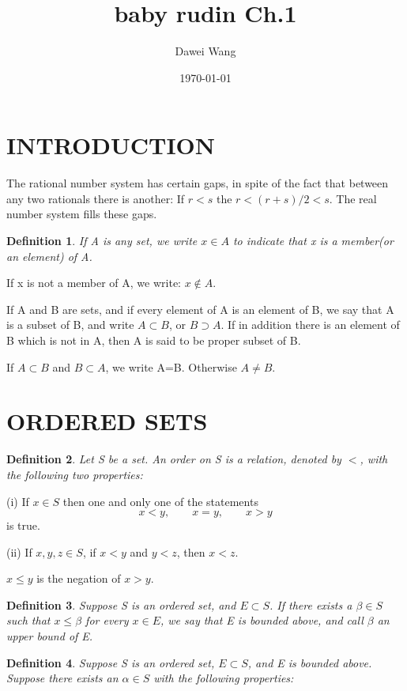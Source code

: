 \documentclass{article}
\title{baby rudin Ch.1}
\author{Dawei Wang}
\date{\today}
\newtheorem{defi}{Definition}
\begin{document}
	\maketitle	
\section{INTRODUCTION}
The rational number system has certain gaps, in spite of the fact that between any two rationals there is another: If $r<s$ the $r<(r+s)/2<s$. The real number system fills these gaps.

\hspace*{\fill}

\begin{defi}
	If A is any set, we write $x\in A$ to indicate that x is a member(or an element) of A.
\end{defi}

If x is not a member of A, we write: $x\notin A$.

If A and B are sets, and if every element of A is an element of B, we say that A is a subset of B, and write $A\subset B$, or $B\supset A$. If in addition there is an element of B which is not in A, then A is said to be proper subset of B.

If $A\subset B$	and $B\subset A$, we write A=B. Otherwise $A\neq B$.

\section{ORDERED SETS}
\begin{defi}
	Let S be a set. An order on S is a relation, denoted by $<$, with the  following two properties:
\end{defi}

(i) If $ x\in S $ then one and only one of the statements
\[
x<y,\qquad x=y,\qquad x>y
\]
is true.

(ii) If $ x,y,z\in S $, if $x<y$ and $y<z$, then $x<z$.

$ x\le y $ is the negation of $x>y$.

\hspace*{\fill}

\begin{defi}
	 Suppose S is an ordered set, and $ E\subset S  $. If there exists a $ \beta\in S $ such that $ x\le \beta $ for every $ x\in E $, we say that E is bounded above, and call $ \beta $ an upper bound of E.
\end{defi}

\begin{defi}
	Suppose S is an ordered set, $ E\subset S $, and E is bounded above. Suppose there exists an $ \alpha\in S $ with the following properties:
\end{defi}
\end{document}
